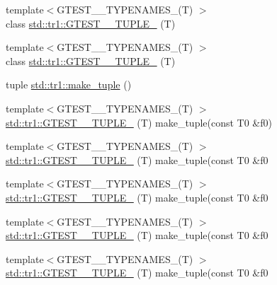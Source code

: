 \begin{DoxyCompactItemize}
{\footnotesize template$<$G\+T\+E\+S\+T\+\_\+\_\+\+T\+Y\+P\+E\+N\+A\+M\+E\+S\+\_\+(\+T) $>$ }\\class \mbox{\hyperlink{namespacestd_1_1tr1_ab2b1c72e9db7436909d9ac011645f29d}{std\+::tr1\+::\+G\+T\+E\+S\+T\+\_\+\_\+\+T\+U\+P\+L\+E\+\_\+}} (T)
\item 
{\footnotesize template$<$G\+T\+E\+S\+T\+\_\+\_\+\+T\+Y\+P\+E\+N\+A\+M\+E\+S\+\_\+(\+T) $>$ }\\class \mbox{\hyperlink{namespacestd_1_1tr1_ab4f2c7d5458171bec6c4330fc5c7aba6}{std\+::tr1\+::\+G\+T\+E\+S\+T\+\_\+\_\+\+T\+U\+P\+L\+E\+\_\+}} (T)
\item 
tuple \mbox{\hyperlink{namespacestd_1_1tr1_af7e12a0f5b5791b5b7c49a5a17b85359}{std\+::tr1\+::make\+\_\+tuple}} ()
\item 
{\footnotesize template$<$G\+T\+E\+S\+T\+\_\+\_\+\+T\+Y\+P\+E\+N\+A\+M\+E\+S\+\_\+(\+T) $>$ }\\\mbox{\hyperlink{namespacestd_1_1tr1_a8b196fb65b7521a688f59c51418ab191}{std\+::tr1\+::\+G\+T\+E\+S\+T\+\_\+\_\+\+T\+U\+P\+L\+E\+\_\+}} (T) make\+\_\+tuple(const T0 \&f0)
\item 
{\footnotesize template$<$G\+T\+E\+S\+T\+\_\+\_\+\+T\+Y\+P\+E\+N\+A\+M\+E\+S\+\_\+(\+T) $>$ }\\\mbox{\hyperlink{namespacestd_1_1tr1_a90d9f0e7f95fa1c2093372d72493c3c1}{std\+::tr1\+::\+G\+T\+E\+S\+T\+\_\+\_\+\+T\+U\+P\+L\+E\+\_\+}} (T) make\+\_\+tuple(const T0 \&f0
\item 
{\footnotesize template$<$G\+T\+E\+S\+T\+\_\+\_\+\+T\+Y\+P\+E\+N\+A\+M\+E\+S\+\_\+(\+T) $>$ }\\\mbox{\hyperlink{namespacestd_1_1tr1_a4493d91e61718415264f7e72fea42930}{std\+::tr1\+::\+G\+T\+E\+S\+T\+\_\+\_\+\+T\+U\+P\+L\+E\+\_\+}} (T) make\+\_\+tuple(const T0 \&f0
\item 
{\footnotesize template$<$G\+T\+E\+S\+T\+\_\+\_\+\+T\+Y\+P\+E\+N\+A\+M\+E\+S\+\_\+(\+T) $>$ }\\\mbox{\hyperlink{namespacestd_1_1tr1_a4e57e6fab4219802275bd31821b31b58}{std\+::tr1\+::\+G\+T\+E\+S\+T\+\_\+\_\+\+T\+U\+P\+L\+E\+\_\+}} (T) make\+\_\+tuple(const T0 \&f0
\item 
{\footnotesize template$<$G\+T\+E\+S\+T\+\_\+\_\+\+T\+Y\+P\+E\+N\+A\+M\+E\+S\+\_\+(\+T) $>$ }\\\mbox{\hyperlink{namespacestd_1_1tr1_a6f8af2da768a7ea1e48b2700d1288166}{std\+::tr1\+::\+G\+T\+E\+S\+T\+\_\+\_\+\+T\+U\+P\+L\+E\+\_\+}} (T) make\+\_\+tuple(const T0 \&f0
\item 

\end{DoxyCompactItemize}
